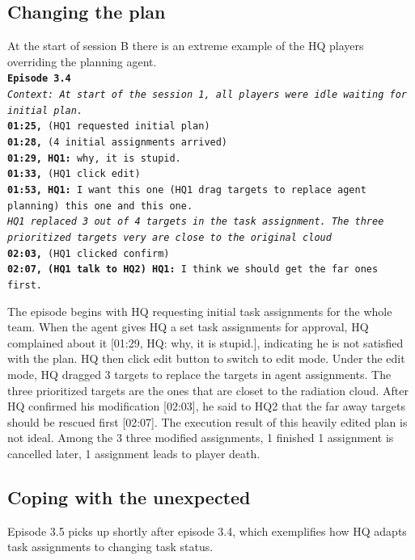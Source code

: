 \subsection{Changing the plan}
At the start of session B there is an extreme example of the HQ players overriding the planning agent. \\

\noindent\texttt{\textbf{Episode 3.4}\\
\emph{Context: At start of the session 1, all players were idle waiting for initial plan.}\\
\textbf{01:25,} (HQ1 requested initial plan)\\
\textbf{01:28,} (4 initial assignments arrived)  \\
\textbf{01:29, HQ1:}  why, it is stupid. \\
\textbf{01:33,} (HQ1 click edit)\\
\textbf{01:53, HQ1:} I want this one (HQ1 drag targets to replace agent planning) this one and this one.\\
\emph{HQ1 replaced 3 out of 4 targets in the task assignment. The three prioritized targets very are close to the original cloud}\\
\textbf{02:03,} (HQ1 clicked confirm) \\
\textbf{02:07, (HQ1 talk to HQ2) HQ1:} I think we should get the far ones first. \\
}

The episode begins with HQ requesting initial task assignments for the whole team. When the agent gives HQ  a set task assignments for approval, HQ complained about it [01:29, HQ: why, it is stupid.], indicating he is not satisfied with the plan. HQ then click edit button to switch to edit mode. Under the edit mode, HQ dragged 3 targets to replace the targets in agent assignments. The three prioritized targets are the ones that are closet to the radiation cloud. After HQ confirmed his modification [02:03], he said to HQ2 that the far away targets should be rescued first [02:07]. The execution result of this heavily edited plan is not ideal. Among the 3 three modified assignments, 1 finished 1 assignment is cancelled later, 1 assignment leads to player death.\\

\subsection{Coping with the unexpected}
Episode 3.5 picks up shortly after episode 3.4, which exemplifies how HQ adapts task assignments to changing task status. \\

